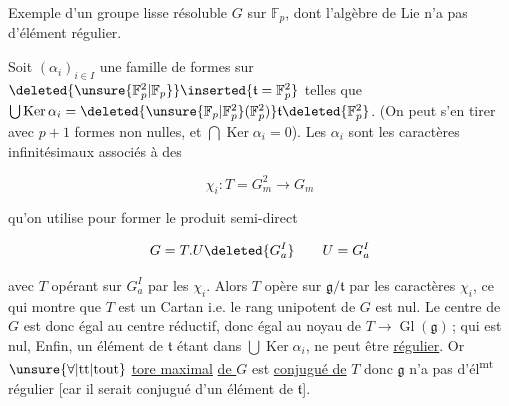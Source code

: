 
Exemple d'un groupe lisse résoluble  $G$ sur $\mathbb F_p$,  dont l'algèbre
de Lie n'a pas d'élément régulier.

Soit $(\alpha_i)_{i\in I}$ une famille  de formes  sur $\deleted{\unsure{\mathbb F_p^2|\mathbb F_p}}\inserted{\mathfrak t=\mathbb F_p^2}$ telles que
$\bigcup\operatorname{Ker}\alpha_i=\deleted{\unsure{\mathbb F_p|\mathbb F_p^2}(\mathbb F_p^2)}\mathfrak t\deleted{\mathbb F_p^2}$. (On peut s'en tirer
avec $p+1$ formes non nulles, et $\bigcap\operatorname{Ker}\alpha_i=0$). 
Les $\alpha_i$ sont les caractères infinitésimaux associés
à des 

\[
\chi_i:T=G_m^2\longrightarrow G_m
\]

qu'on utilise pour former le produit semi-direct

\[
G=T.U\deleted{G_a^I}\qquad U=G_a^I
\]

avec $T$ opérant sur $G_a^I$ par les $\chi_i$.
Alors $T$ opère sur $\mathfrak g/\mathfrak t$ par les caractères
$\chi_i$, ce qui montre que $T$ est un Cartan
i.e. le rang unipotent de $G$ est nul. Le
centre de $G$ est donc égal au centre réductif, donc
égal au noyau de $T\longrightarrow\operatorname{Gl}(\mathfrak g)$\,; qui est
nul,  Enfin, un  élément
 de $\mathfrak t$  étant dans
$\bigcup\operatorname{Ker}\alpha_i$, ne peut être \uline{régulier}. Or \uline{$\unsure{\forall|\text{tt}|\text{tout}}$}
\uline{tore maximal} \uline{de $G$} est \uline{conjugué de} $T$
\deleted{\unsure{[comme|comme}} \inserted{(par un élément unique de $U(\mathbb F_p)$]} donc
 $\mathfrak g$ n'a pas d'él\textsuperscript{mt} régulier [car
il serait conjugué d'un élément de $\mathfrak t$].


